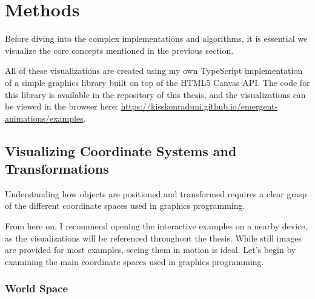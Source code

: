 \section{Methods}
\label{sec:methods}

Before diving into the complex implementations and algorithms, it is essential we visualize the core concepts mentioned in the previous section.

\begin{Note} 
    All of these visualizations are created using my own TypeScript implementation of a simple graphics library built on top of the HTML5 Canvas API. The code for this library is available in the repository of this thesis, and the visualizations can be viewed in the browser here: \url{https://kisskonraduni.github.io/emergent-animations/examples}.
\end{Note}

\vspace{1cm}

\subsection{Visualizing Coordinate Systems and Transformations}
\label{sec:visualizing-coordinate-systems}

Understanding how objects are positioned and transformed requires a clear grasp of the different coordinate spaces used in graphics programming.

From here on, I recommend opening the interactive examples on a nearby device, as the visualizations will be referenced throughout the thesis. While still images are provided for most examples, seeing them in motion is ideal. Let's begin by examining the main coordinate spaces used in graphics programming.

\subsubsection{World Space}
\label{sec:world-space}

